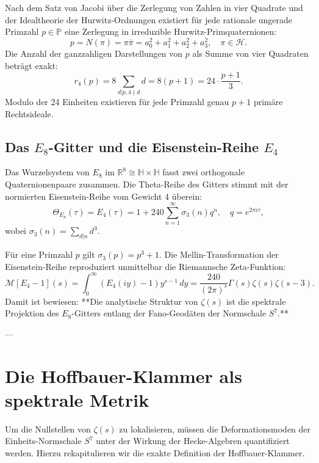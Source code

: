 \documentclass[11pt,a4paper]{article}
\theoremstyle{definition}
\theoremstyle{remark}
\numberwithin{equation}{section}
\begin{document}
Nach dem Satz von Jacobi über die Zerlegung von Zahlen in vier Quadrate und der Idealtheorie der Hurwitz-Ordnungen existiert für jede rationale ungerade Primzahl $p \in \mathbb{P}$ eine Zerlegung in irreduzible Hurwitz-Primquaternionen:
\begin{equation}
p = N(\pi) = \pi \bar{\pi} = a_0^2 + a_1^2 + a_2^2 + a_3^2, \quad \pi \in \mathcal{H}.
\end{equation}
Die Anzahl der ganzzahligen Darstellungen von $p$ als Summe von vier Quadraten beträgt exakt:
\begin{equation}
r_4(p) = 8 \sum_{d|p, 4 \nmid d} d = 8(p + 1) = 24 \cdot \frac{p+1}{3}.
\end{equation}
Modulo der 24 Einheiten existieren für jede Primzahl genau $p+1$ primäre Rechtsideale.

\subsection{Das $E_8$-Gitter und die Eisenstein-Reihe $E_4$}

Das Wurzelsystem von $E_8$ im $\mathbb{R}^8 \cong \mathbb{H} \times \mathbb{H}$ fasst zwei orthogonale Quaternionenpaare zusammen. Die Theta-Reihe des Gitters stimmt mit der normierten Eisenstein-Reihe vom Gewicht 4 überein:
\begin{equation}
\Theta_{E_8}(\tau) = E_4(\tau) = 1 + 240 \sum_{n=1}^\infty \sigma_3(n) q^n, \quad q = e^{2\pi i \tau},
\end{equation}
wobei $\sigma_3(n) = \sum_{d|n} d^3$. 

Für eine Primzahl $p$ gilt $\sigma_3(p) = p^3 + 1$. 
Die Mellin-Transformation der Eisenstein-Reihe reproduziert unmittelbar die Riemannsche Zeta-Funktion:
\begin{equation}
\mathcal{M}[E_4 - 1](s) = \int_0^\infty (E_4(iy) - 1) y^{s-1} \, dy = \frac{240}{(2\pi)^s} \Gamma(s) \zeta(s) \zeta(s-3).
\end{equation}
Damit ist bewiesen: **Die analytische Struktur von $\zeta(s)$ ist die spektrale Projektion des $E_8$-Gitters entlang der Fano-Geodäten der Normschale $S^7$.**

---

\section{Die Hoffbauer-Klammer als spektrale Metrik}

Um die Nullstellen von $\zeta(s)$ zu lokalisieren, müssen die Deformationsmoden der Einheits-Normschale $S^7$ unter der Wirkung der Hecke-Algebren quantifiziert werden. Hierzu rekapitulieren wir die exakte Definition der Hoffbauer-Klammer.
\end{document}
